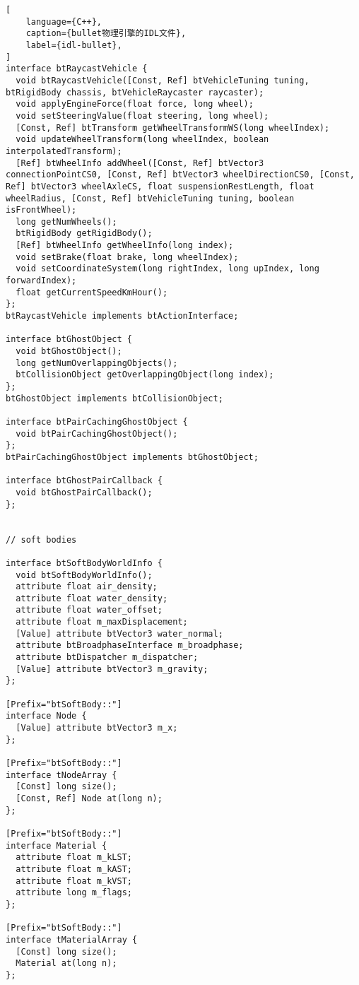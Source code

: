 \begin{lstlisting}[
    language={C++},
    caption={bullet物理引擎的IDL文件},
    label={idl-bullet},
]
interface btRaycastVehicle {
  void btRaycastVehicle([Const, Ref] btVehicleTuning tuning, btRigidBody chassis, btVehicleRaycaster raycaster);
  void applyEngineForce(float force, long wheel);
  void setSteeringValue(float steering, long wheel);
  [Const, Ref] btTransform getWheelTransformWS(long wheelIndex);
  void updateWheelTransform(long wheelIndex, boolean interpolatedTransform);
  [Ref] btWheelInfo addWheel([Const, Ref] btVector3 connectionPointCS0, [Const, Ref] btVector3 wheelDirectionCS0, [Const, Ref] btVector3 wheelAxleCS, float suspensionRestLength, float wheelRadius, [Const, Ref] btVehicleTuning tuning, boolean isFrontWheel);
  long getNumWheels();
  btRigidBody getRigidBody();
  [Ref] btWheelInfo getWheelInfo(long index);
  void setBrake(float brake, long wheelIndex);
  void setCoordinateSystem(long rightIndex, long upIndex, long forwardIndex);
  float getCurrentSpeedKmHour();
};
btRaycastVehicle implements btActionInterface;

interface btGhostObject {
  void btGhostObject();
  long getNumOverlappingObjects();
  btCollisionObject getOverlappingObject(long index);
};
btGhostObject implements btCollisionObject;

interface btPairCachingGhostObject {
  void btPairCachingGhostObject();
};
btPairCachingGhostObject implements btGhostObject;

interface btGhostPairCallback {
  void btGhostPairCallback();
};


// soft bodies

interface btSoftBodyWorldInfo {
  void btSoftBodyWorldInfo();
  attribute float air_density;
  attribute float water_density;
  attribute float water_offset;
  attribute float m_maxDisplacement;
  [Value] attribute btVector3 water_normal;
  attribute btBroadphaseInterface m_broadphase;
  attribute btDispatcher m_dispatcher;
  [Value] attribute btVector3 m_gravity;
};

[Prefix="btSoftBody::"]
interface Node {
  [Value] attribute btVector3 m_x;
};

[Prefix="btSoftBody::"]
interface tNodeArray {
  [Const] long size();
  [Const, Ref] Node at(long n);
};

[Prefix="btSoftBody::"]
interface Material {
  attribute float m_kLST;
  attribute float m_kAST;
  attribute float m_kVST;
  attribute long m_flags;
};

[Prefix="btSoftBody::"]
interface tMaterialArray {
  [Const] long size();
  Material at(long n);
};


\end{lstlisting}

